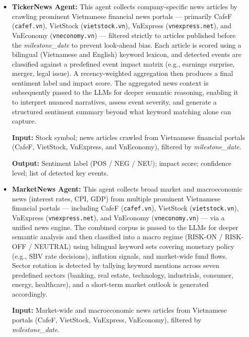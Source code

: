 \documentclass{ieeeaccess}
\begin{document}
\begin{itemize}
    \item \textbf{TickerNews Agent:}
    This agent collects company-specific news articles by crawling prominent Vietnamese financial
    news portals — primarily CafeF (\texttt{cafef.vn}), VietStock (\texttt{vietstock.vn}),
    VnExpress (\texttt{vnexpress.net}), and VnEconomy (\texttt{vneconomy.vn}) — filtered
    strictly to articles published before the \textit{milestone\_date} to prevent look-ahead bias.
    Each article is scored using a bilingual (Vietnamese and English) keyword lexicon, and
    detected events are classified against a predefined event impact matrix (e.g., earnings
    surprise, merger, legal issue). A recency-weighted aggregation then produces a final
    sentiment label and impact score. The aggregated news context is subsequently passed to the LLMs for deeper semantic reasoning, enabling it to interpret nuanced
    narratives, assess event severity, and generate a structured sentiment summary beyond
    what keyword matching alone can capture.

    \textbf{Input:} Stock symbol; news articles crawled from Vietnamese financial portals (CafeF,
    VietStock, VnExpress, and VnEconomy), filtered by \textit{milestone\_date}.

    \textbf{Output:} Sentiment label (POS / NEG / NEU); impact score; confidence level;
    list of detected key events.



    \item \textbf{MarketNews Agent:}
    This agent collects broad market and macroeconomic news (interest rates, CPI, GDP) from
    multiple prominent Vietnamese financial portals — including CafeF (\texttt{cafef.vn}),
    VietStock (\texttt{vietstock.vn}), VnExpress (\texttt{vnexpress.net}), and VnEconomy
    (\texttt{vneconomy.vn}) — via a unified news engine. The combined corpus is passed to the
    LLMs for deeper semantic analysis and then classified into a macro regime (RISK-ON / RISK-OFF
    / NEUTRAL) using bilingual keyword sets covering monetary policy (e.g., SBV rate decisions),
    inflation signals, and market-wide fund flows. Sector rotation is detected by tallying keyword
    mentions across seven predefined sectors (banking, real estate, technology, industrials,
    consumer, energy, healthcare), and a short-term market outlook is generated accordingly.

    \textbf{Input:} Market-wide and macroeconomic news articles from Vietnamese portals (CafeF,
    VietStock, VnExpress, VnEconomy), filtered by \textit{milestone\_date}.


\end{itemize}
\end{document}
